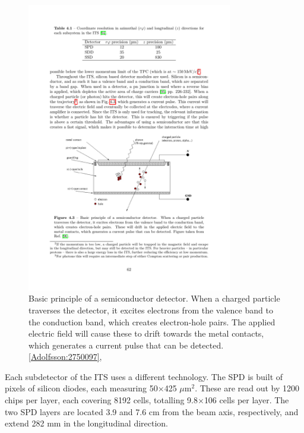 \begin{figure}[htpb]
  \centering
  \includegraphics[width=0.8\textwidth]{Experimental_Aparatus/silicon_detector.pdf}
  \caption{Basic principle of a semiconductor detector. When a charged particle traverses the detector, it excites electrons from the valence band to the conduction band, which creates electron-hole pairs. The applied electric field will cause these to drift towards the metal contacts, which generates a current pulse that can be detected. \ref{Adolfsson:2750097},}
  \label{fig:silicon}
\end{figure}

Each subdetector of the ITS uses a different technology. The SPD is built of pixels of silicon diodes, each measuring 50×425 $\mu$m$^2$. These are read out by 1200 chips per layer, each covering 8192 cells, totalling 9.8$\times$106 cells per layer. The two SPD layers are located 3.9 and 7.6 cm from the beam axis, respectively, and extend 282 mm in the longitudinal direction.

